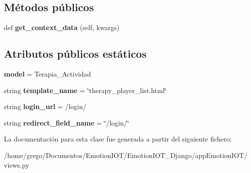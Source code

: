\subsection*{Métodos públicos}
\begin{DoxyCompactItemize}
\item 
def {\bfseries get\+\_\+context\+\_\+data} (self, kwargs)\hypertarget{classappEmotionIOT_1_1views_1_1Terapia__player__list_a991231408ac537a63686e72f2f2b3424}{}\label{classappEmotionIOT_1_1views_1_1Terapia__player__list_a991231408ac537a63686e72f2f2b3424}

\end{DoxyCompactItemize}
\subsection*{Atributos públicos estáticos}
\begin{DoxyCompactItemize}
\item 
{\bfseries model} = Terapia\+\_\+\+Actividad\hypertarget{classappEmotionIOT_1_1views_1_1Terapia__player__list_abf12bfafc2ee1a1c1416cdbe8f1d7fe7}{}\label{classappEmotionIOT_1_1views_1_1Terapia__player__list_abf12bfafc2ee1a1c1416cdbe8f1d7fe7}

\item 
string {\bfseries template\+\_\+name} = \char`\"{}therapy\+\_\+player\+\_\+list.\+html\char`\"{}\hypertarget{classappEmotionIOT_1_1views_1_1Terapia__player__list_adc8c65d4d6569a9080dcdb0236c444b3}{}\label{classappEmotionIOT_1_1views_1_1Terapia__player__list_adc8c65d4d6569a9080dcdb0236c444b3}

\item 
string {\bfseries login\+\_\+url} = \textquotesingle{}/login/\textquotesingle{}\hypertarget{classappEmotionIOT_1_1views_1_1Terapia__player__list_a84c8f204877d44046cdbe95391cfcdd2}{}\label{classappEmotionIOT_1_1views_1_1Terapia__player__list_a84c8f204877d44046cdbe95391cfcdd2}

\item 
string {\bfseries redirect\+\_\+field\+\_\+name} = \char`\"{}/login/\char`\"{}\hypertarget{classappEmotionIOT_1_1views_1_1Terapia__player__list_a0b87d3b7033fcac71c59da70dcc5244b}{}\label{classappEmotionIOT_1_1views_1_1Terapia__player__list_a0b87d3b7033fcac71c59da70dcc5244b}

\end{DoxyCompactItemize}


La documentación para esta clase fue generada a partir del siguiente fichero\+:\begin{DoxyCompactItemize}
\item 
/home/grego/\+Documentos/\+Emotion\+I\+O\+T/\+Emotion\+I\+O\+T\+\_\+\+Django/app\+Emotion\+I\+O\+T/views.\+py\end{DoxyCompactItemize}
